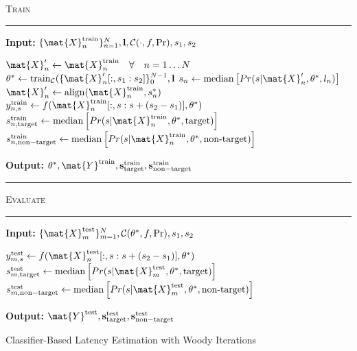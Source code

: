 \newpage
\begin{algorithm}[H]
	\textsc{Train}
	\smallskip \hrule \smallskip
	\textbf{Input:} $\{\mat{X}_n^\mathrm{train}\}_{n=1}^N, \mathbf{l},
		\mathcal{C}(\cdot,f,\Pr), s_1, s_2$
	\begin{algorithmic}[1]
		\State $\mat{X}'_n \gets \mat{X}^\mathrm{train}_n \quad \forall \quad n=1\ldots
    N$
		\Repeat
		\State $\theta^* \gets \mathrm{train}_\mathcal{C}(\{\mat{X}'_n[:,s_1:s_2]\}_0^{N-1},\mathbf{l}$
    \State  $s_n \gets
			    \mathrm{median}\left[Pr(s|\mat{X}_n',\theta^*,l_n)\right]$
		\State $\mat{X}'_n \gets \mathrm{align}(\mat{X}^\mathrm{train}_n, s^*_n)$
		\EndFor
      \State $y_{n,s}^\mathrm{train} \gets
      f(\mat{X}_n^\mathrm{train}[:,s:s+(s_2-s_1)],\theta^*)$
        \EndFor
        \State $s_{n,\mathrm{target}}^\mathrm{train} \gets
			    \mathrm{median}\left[Pr(s|\mat{X}_n^\mathrm{train},\theta^*,\mathrm{target})\right]$
		    \State $s_{n,\mathrm{non-target}}^\mathrm{train}\gets
			    \mathrm{median}\left[Pr(s|\mat{X}_n^\mathrm{train},\theta^*,\textrm{non-target})\right]$
    \EndFor

	\end{algorithmic}
	\textbf{Output:} $\theta^*,
  \mat{Y}^\mathrm{train},
  \mathbf{s}_\mathrm{target}^\mathrm{train},
  \mathbf{s}_\mathrm{non-target}^\mathrm{train}$

	\smallskip \hrule \smallskip
	\textsc{Evaluate}
	\smallskip \hrule \smallskip
	\textbf{Input:} $\{\mat{X}_m^\mathrm{test}\}_{m=1}^N, \mathcal{C}(\theta^*,f, \Pr), s_1, s_2$
  \begin{algorithmic}[1]
      \State $y_{m,s}^\mathrm{test} \gets
      f(\mat{X}_n^\mathrm{test}[:,s:s+(s_2-s_1)],\theta^*)$
        \EndFor
        \State $s_{m,\mathrm{target}}^\mathrm{test} \gets
			    \mathrm{median}\left[Pr(s|\mat{X}_m^\mathrm{test},\theta^*,\mathrm{target})\right]$
		    \State $s_{m,\mathrm{non-target}}^\mathrm{test}\gets
			    \mathrm{median}\left[Pr(s|\mat{X}_m^\mathrm{test},\theta^*,\textrm{non-target})\right]$
    \EndFor
	\end{algorithmic}
  \textbf{Output:} $\mat{Y}^\mathrm{test},
  \mathbf{s}_\mathrm{target}^\mathrm{test},
  \mathbf{s}_\mathrm{non-target}^\mathrm{test}$
	\caption{Classifier-Based Latency Estimation with Woody Iterations}
	\label{alg:wcble}
\end{algorithm}
